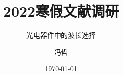 \usepackage{makeidx}
\makeindex

\usepackage{latexcolors}

\usepackage{tikz}

\usepackage{multicol}   %

\usepackage[space, hyperref, UTF8]{ctex}	%

\usepackage{amsmath,amssymb,amsthm}
\usepackage{esint}		%
\usepackage{amsfonts}
\usepackage{latexsym}
\usepackage{extarrows}  	%
\usepackage{physics}
\usepackage{upgreek}    	%
\usepackage{bm}     		%
\usepackage{slashed}    	%


\usepackage{graphicx}   %
\usepackage{float}      %
\usepackage{subfigure}  %





\title[文献调研]{2022寒假文献调研}
\subtitle{光电器件中的波长选择}
\author{冯哲}
\date{\today}

